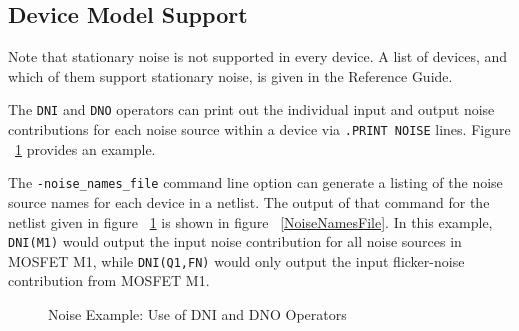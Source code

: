 

\subsection{Device Model Support}

Note that stationary noise is not supported in every \Xyce{} device.
A list of \Xyce{} devices, and which of them support stationary noise,
is given in the \Xyce{} Reference Guide\ReferenceGuide{}.

The \texttt{DNI} and \texttt{DNO} operators can print out the individual
input and output noise contributions for each noise source within a device
via \verb|.PRINT NOISE| lines.  Figure ~\ref{DniDnoExample} provides an
example.

The \texttt{-noise\_names\_file} command line option can generate a listing
of the noise source names for each device in a netlist.  The output of that
command for the netlist given in figure ~\ref{DniDnoExample} is shown in
figure ~\ref{NoiseNamesFile}.  In this example, \texttt{DNI(M1)} would
output the input noise contribution for all noise sources in MOSFET M1, while
\texttt{DNI(Q1,FN)} would only output the input flicker-noise contribution
from MOSFET M1.

\begin{figure}[htbp]
  \begin{centering}
\caption[Noise Example: Use of DNI and DNO Operators]
{Noise Example: Use of DNI and DNO Operators\label{DniDnoExample} }
\end{centering}
\end{figure}

